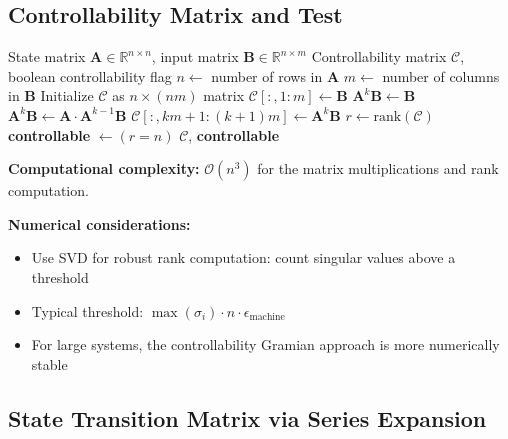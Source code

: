 \subsection{Controllability Matrix and Test}

\begin{algorithm}[H]
\caption{Controllability Matrix Computation and Test}
\label{alg:controllability}
\begin{algorithmic}[1]
\REQUIRE State matrix $\mathbf{A} \in \mathbb{R}^{n \times n}$, input matrix $\mathbf{B} \in \mathbb{R}^{n \times m}$
\ENSURE Controllability matrix $\mathcal{C}$, boolean controllability flag
\STATE $n \gets$ number of rows in $\mathbf{A}$
\STATE $m \gets$ number of columns in $\mathbf{B}$
\STATE Initialize $\mathcal{C}$ as $n \times (nm)$ matrix
\STATE
\STATE $\mathcal{C}[:, 1:m] \gets \mathbf{B}$ 
\STATE $\mathbf{A}^k\mathbf{B} \gets \mathbf{B}$
    \STATE $\mathbf{A}^k\mathbf{B} \gets \mathbf{A} \cdot \mathbf{A}^{k-1}\mathbf{B}$ 
    \STATE $\mathcal{C}[:, km+1:(k+1)m] \gets \mathbf{A}^k\mathbf{B}$
\ENDFOR
\STATE
\STATE $r \gets \text{rank}(\mathcal{C})$ 
\STATE \textbf{controllable} $\gets (r = n)$
\STATE
\RETURN $\mathcal{C}$, \textbf{controllable}
\end{algorithmic}
\end{algorithm}

\textbf{Computational complexity:} $\mathcal{O}(n^3)$ for the matrix multiplications and rank computation.

\textbf{Numerical considerations:}
\begin{itemize}
    \item Use SVD for robust rank computation: count singular values above a threshold
    \item Typical threshold: $\max(\sigma_i) \cdot n \cdot \epsilon_{\text{machine}}$
    \item For large systems, the controllability Gramian approach is more numerically stable
\end{itemize}

\subsection{State Transition Matrix via Series Expansion}

